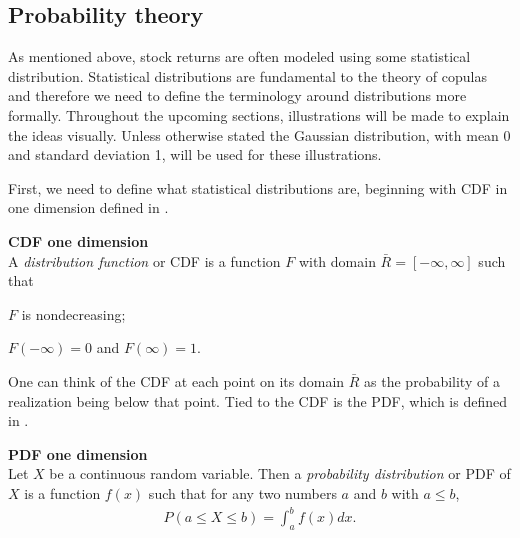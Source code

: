 





\subsection{Probability theory}
As mentioned above, stock returns are often modeled using some statistical distribution. Statistical distributions are fundamental to the theory of copulas and therefore we need to define the terminology around distributions more formally. Throughout the upcoming sections, illustrations will be made to explain the ideas visually. Unless otherwise stated the Gaussian distribution, with mean 0 and standard deviation 1, will be used for these illustrations.

First, we need to define what statistical distributions are, beginning with \gls{CDF} in one dimension defined in .
\begin{definition}\label{def:CDF1d} \textbf{CDF one dimension }  \citet[p.~17]{Nelsen2006}\\
    A \emph{distribution function} or \gls{CDF} is a function $F$ with domain $\bar{R} = [-\infty, \infty]$ such that 
    \begin{compactenum}
        \item $F$ is nondecreasing; 
        \item $F(-\infty)=0$ and $F(\infty)=1$.
    \end{compactenum}
\end{definition}

One can think of the \gls{CDF} at each point on its domain $\bar{R}$ as the probability of a realization being below that point. Tied to the \gls{CDF} is the \gls{PDF}, which is defined in .

\begin{definition}\label{def:PDF1d} \textbf{PDF one dimension} \citet[pp.~160-161]{DevoreBerk2012}\\
    Let $X$ be a continuous random variable. Then a \emph{probability distribution} or \gls{PDF} of $X$ is a function $f(x)$ such that for any two numbers $a$ and $b$ with $a \leq  b$,
        \begin{align*}
            P(a \leq X \leq b) = \int_a^bf(x)dx.\\
        \end{align*}
\end{definition}


